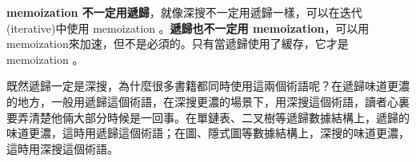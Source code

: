 \textbf{memoization 不一定用遞歸}，就像深搜不一定用遞歸一樣，可以在迭代(iterative)中使用 memoization 。\textbf{遞歸也不一定用 memoization}，可以用memoization來加速，但不是必須的。只有當遞歸使用了緩存，它才是 memoization 。

既然遞歸一定是深搜，為什麼很多書籍都同時使用這兩個術語呢？在遞歸味道更濃的地方，一般用遞歸這個術語，在深搜更濃的場景下，用深搜這個術語，讀者心裏要弄清楚他倆大部分時候是一回事。在單鏈表、二叉樹等遞歸數據結構上，遞歸的味道更濃，這時用遞歸這個術語；在圖、隱式圖等數據結構上，深搜的味道更濃，這時用深搜這個術語。
